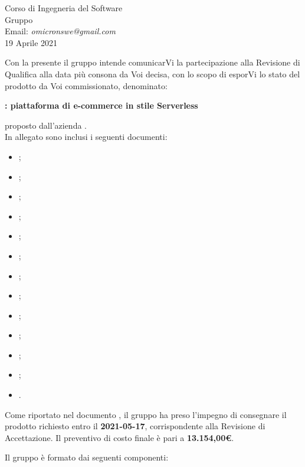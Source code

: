\documentclass[12pt,a4paper]{letter}
\begin{document}
\begin{letter}
{\begin{flushleft}
			\vspace{1cm}
            Corso di Ingegneria del Software\\ Gruppo \Omicron{}\\ Email:  \textit{omicronswe@gmail.com} \\ 19 Aprile 2021 
        \end{flushleft}
        }
        \opening{ Con la presente il gruppo \Omicron{} intende comunicarVi la partecipazione alla Revisione di Qualifica alla data più consona da Voi decisa, con lo scopo di esporVi lo stato del prodotto da Voi commissionato, denominato:}
        \begin{center}
           \textbf{\nameproject{} : piattaforma di e-commerce in stile Serverless} 
        \end{center}
        proposto dall'azienda \textit{\Proponente{}}.\\
        In allegato sono inclusi i seguenti documenti:
            \begin{itemize}
                \item {};
                \item {};
                \item {};
                \item {};
                \item {};
                \item {};
                \item {};
                \item {};
                \item {};
                \item {};
                \item {};
                \item {};
                \item {}.
            \end{itemize}
        
        Come riportato nel documento , il gruppo ha preso l'impegno di consegnare il prodotto richiesto entro il \textbf{2021-05-17}, corrispondente alla Revisione di Accettazione. Il preventivo di costo finale è pari a \textbf{13.154,00\euro{}}.
        
        Il gruppo è formato dai seguenti componenti:
        
        {

}
\end{letter}
\end{document}
